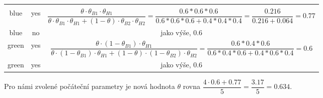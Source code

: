 \begin{enumerate}
\begin{center}
{\begin{tabular}{cc|c}
      \footnotemark \\
    blue & yes &
      $\dfrac{\theta\cdot\theta_{B1}\cdot\theta_{H1}}{\theta\cdot\theta_{B1}\cdot\theta_{H1} + (1-\theta)\cdot\theta_{B2}\cdot\theta_{H2}}
      = \dfrac{0{.}6*0{.}6*0{.}6}{0{.}6*0{.}6*0{.}6 + 0{.}4*0{.}4*0{.}4} = \dfrac{0{.}216}{0{.}216 + 0{.}064} = 0{.}77$ \\
    blue & no & jako výše, $0{.}6$ \\
    green & yes &
      $\dfrac{\theta\cdot(1-\theta_{B1})\cdot\theta_{H1}}{\theta\cdot(1-\theta_{B1})\cdot\theta_{H1} + (1-\theta)\cdot(1-\theta_{B2})\cdot\theta_{H2}}
      = \dfrac{0{.}6*0{.}4*0{.}6}{0{.}6*0{.}4*0{.}6 + 0{.}4*0{.}6*0{.}4} = 0{.}6$ \\
    green & yes & jako výše, $0{.}6$ \\
    \bottomrule
    \end{tabular}}
    \end{center}
    Pro námi zvolené počáteční parametry je nová hodnota $\theta$ rovna $\dfrac{4\cdot 0{.}6 + 0{.}77}{5} = \dfrac{3{.}17}{5} = 0{.}634$.
\end{enumerate}
